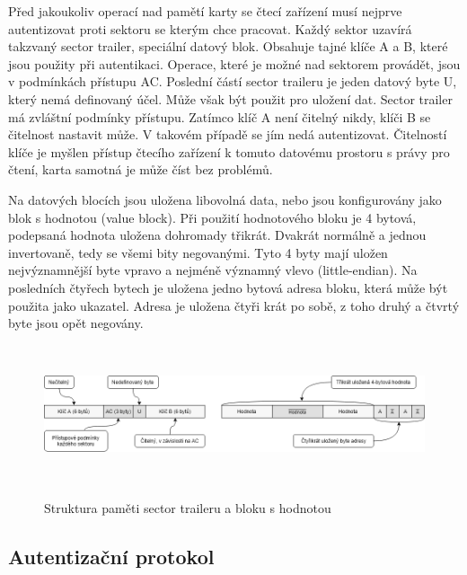 \par
Před jakoukoliv operací nad pamětí karty se čtecí zařízení musí nejprve autentizovat proti sektoru se kterým chce pracovat. Každý sektor uzavírá takzvaný sector trailer, speciální datový blok. Obsahuje tajné klíče A a B, které jsou použity při autentikaci. Operace, které je možné nad sektorem provádět, jsou v podmínkách přístupu AC. Poslední částí sector traileru je jeden datový byte U, který nemá definovaný účel. Může však být použit pro uložení dat. Sector trailer má zvláštní  podmínky přístupu. Zatímco klíč A není čitelný nikdy, klíči B se čitelnost nastavit může. V takovém případě se jím nedá autentizovat. Čitelností klíče je myšlen přístup čtecího zařízení k tomuto datovému prostoru s právy pro čtení, karta samotná je může číst bez problémů.
\par
Na datových blocích jsou uložena libovolná data, nebo jsou konfigurovány jako blok s hodnotou (value block). Při použití hodnotového bloku je 4 bytová, podepsaná hodnota uložena dohromady třikrát. Dvakrát normálně a jednou invertovaně, tedy se všemi bity negovanými. Tyto 4 byty mají uložen nejvýznamnější byte vpravo a nejméně významný vlevo ({little-endian}). Na posledních čtyřech bytech je uložena jedno bytová adresa bloku, která může být použita jako ukazatel. Adresa je uložena čtyři krát po sobě, z toho druhý a čtvrtý byte jsou opět negovány\cite{PracticalAttackOnMIFARE}.

\begin{figure}[h]\centering
  \centering
  \hspace*{-0.07\linewidth}
  \includegraphics[width=1.1\linewidth,height=1.6in]{obrazky-figures/LogicalStructureBetter.png}\\[1pt]  
  \caption{Struktura paměti sector traileru a bloku s hodnotou\cite{PracticalAttackOnMIFARE}}    
  \label{obrazekStrukturaSpecialnichBloku}
  
\end{figure}



\subsection{Autentizační protokol}

